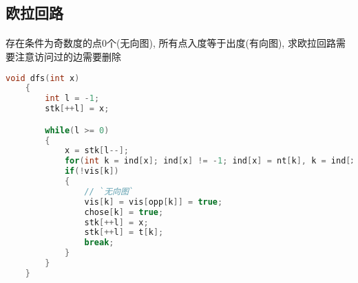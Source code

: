 ﻿\subsection{欧拉回路}
	\paragraph{}
	存在条件为奇数度的点0个(无向图), 所有点入度等于出度(有向图), 求欧拉回路需要注意访问过的边需要删除
	
\begin{lstlisting}[language=C++]
    void dfs(int x)
    {
        int l = -1;
        stk[++l] = x;

        while(l >= 0)
        {
            x = stk[l--];
            for(int k = ind[x]; ind[x] != -1; ind[x] = nt[k], k = ind[x])
            if(!vis[k])
            {
                // `无向图`
                vis[k] = vis[opp[k]] = true;
                chose[k] = true;
                stk[++l] = x;
                stk[++l] = t[k];
                break;
            }
        }
    }
\end{lstlisting}
